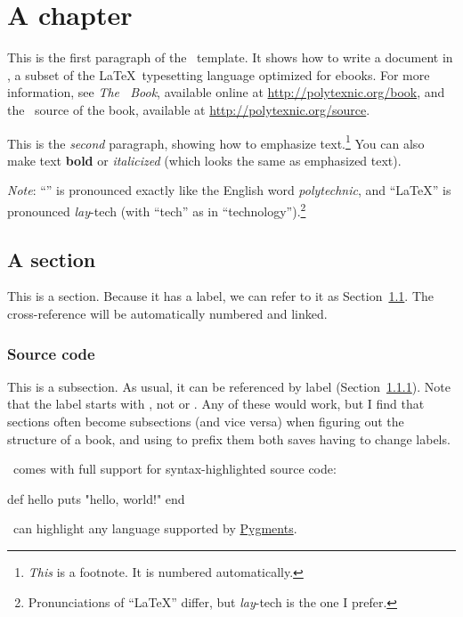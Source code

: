 \chapter{A chapter}
\label{cha:a_chapter}

This is the first paragraph of the \PolyTeXnic\ template. It shows how to write a document in \PolyTeX, a subset of the \LaTeX\ typesetting language optimized for ebooks. For more information, see \emph{The \PolyTeXnic\ Book}, available online at \href{http://polytexnic.org/book}{http://polytexnic.org/book}, and the \PolyTeX\ source of the book, available at \href{http://polytexnic.org/source}{http://polytexnic.org/source}.

This is the \emph{second} paragraph, showing how to emphasize text.\footnote{\emph{This} is a footnote. It is numbered automatically.} You can also make text \textbf{bold} or \textit{italicized} (which looks the same as emphasized text).

\emph{Note}: ``\PolyTeXnic'' is pronounced exactly like the English word \emph{polytechnic}, and ``\LaTeX'' is pronounced \emph{lay}-tech (with ``tech'' as in ``technology'').\footnote{Pronunciations of ``\LaTeX'' differ, but \emph{lay}-tech is the one I prefer.}

\section{A section}
\label{sec:a_section}

This is a section. Because it has a label, we can refer to it as Section~\ref{sec:a_section}. The cross-reference will be automatically numbered and linked.

\subsection{Source code}
\label{sec:source_code}

This is a subsection. As usual, it can be referenced by label (Section~\ref{sec:source_code}). Note that the label starts with , not  or . Any of these would work, but I find that sections often become subsections (and vice versa) when figuring out the structure of a book, and using  to prefix them both saves having to change labels.

\PolyTeXnic\ comes with full support for syntax-highlighted source code:
\begin{code}
def hello
  puts "hello, world!"
end
\end{code}
\noindent \PolyTeXnic\ can highlight any language supported by \href{http://pygments.org/languages/}{Pygments}.

